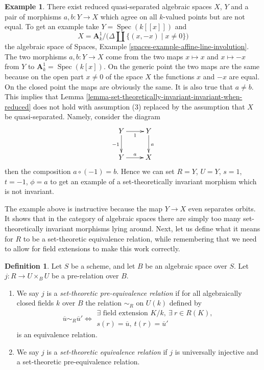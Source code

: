 \documentclass{stacks-project}
\theoremstyle{plain}
\theoremstyle{definition}
\newtheorem{definition}[subsection]{Definition}
\newtheorem{example}[subsection]{Example}
\theoremstyle{remark}
\numberwithin{equation}{subsection}
\def\Spec{\mathop{\mathrm{Spec}}}
\begin{document}
\begin{example}
\label{example-not-invariant}
There exist reduced quasi-separated algebraic spaces $X$, $Y$ and a pair of
morphisms $a, b : Y \to X$ which agree on all $k$-valued points but are not
equal. To get an example take $Y = \Spec(k[[x]])$ and
$$
X = \mathbf{A}^1_k \Big/ \big(\Delta \amalg \{(x, -x) \mid x \not = 0\}\big)
$$
the algebraic space of
Spaces, Example \ref{spaces-example-affine-line-involution}.
The two morphisms $a, b : Y \to X$
come from the two maps $x \mapsto x$ and $x \mapsto -x$
from $Y$ to $\mathbf{A}^1_k = \Spec(k[x])$. On the generic point
the two maps are the same because on the open part $x \not = 0$ of the
space $X$ the functions $x$ and $-x$ are equal. On the closed point
the maps are obviously the same. It is also true that $a \not = b$.
This implies that
Lemma \ref{lemma-set-theoretically-invariant-invariant-when-reduced}
does not hold with assumption (3) replaced by the assumption that $X$
be quasi-separated. Namely, consider the diagram
$$
\xymatrix{
Y \ar[d]_{-1} \ar[r]_1 & Y \ar[d]^a \\
Y \ar[r]^a & X
}
$$
then the composition $a \circ (-1) = b$. Hence we can set $R = Y$,
$U = Y$, $s = 1$, $t = -1$, $\phi = a$ to get an example of a set-theoretically
invariant morphism which is not invariant.
\end{example}

\noindent
The example above is instructive because the map $Y \to X$ even separates
orbits. It shows that in the category of algebraic spaces there are simply
too many set-theoretically invariant morphisms lying around. Next, let us
define what it means for $R$ to be a set-theoretic equivalence relation, while
remembering that we need to allow for field extensions to make this work
correctly.

\begin{definition}
\label{definition-set-theoretic-equivalence}
Let $S$ be a scheme, and let $B$ be an algebraic space over $S$.
Let $j : R \to U \times_B U$ be a pre-relation over $B$.
\begin{enumerate}
\item We say $j$ is a {\it set-theoretic pre-equivalence relation} if
for all algebraically closed fields $k$ over $B$ the relation
$\sim_R$ on $U(k)$ defined by
$$
\overline{u} \sim_R \overline{u}'
\Leftrightarrow
\begin{matrix}
\exists\text{ field extension }K/k, \ \exists\ r \in R(K), \\
s(r) = \overline{u}, \ t(r) = \overline{u}'
\end{matrix}
$$
is an equivalence relation.
\item We say $j$ is a {\it set-theoretic equivalence relation}
if $j$ is universally injective and a set-theoretic pre-equivalence
relation.
\end{enumerate}
\end{definition}
\end{document}

